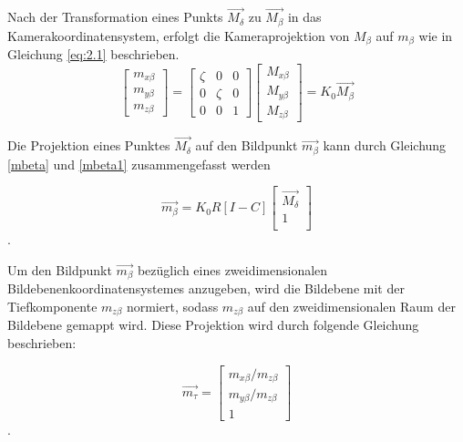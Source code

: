 Nach der Transformation eines Punkts $\vec{M_\delta}$ zu $\vec{M_\beta}$ in das Kamerakoordinatensystem, erfolgt die Kameraprojektion von $M_\beta$ auf $m_\beta$ wie in Gleichung \ref{eq:2.1} beschrieben. %
\begin{equation}
\begin{bmatrix}
m_{x \beta}\\m_{y \beta}\\m_{z \beta}
\end{bmatrix} = \begin{bmatrix}
\zeta&0&0\\
0&\zeta&0\\
0&0&1
\end{bmatrix}
\begin{bmatrix}
M_{x \beta}\\M_{y \beta}\\M_{z \beta}
\end{bmatrix}
=K_0\vec{M_{\beta}}\label{mbeta1}
\end{equation}
\pagebreak

Die Projektion eines Punktes $\vec{M_\delta}$ auf den Bildpunkt $\vec{m_{\beta}}$ kann durch Gleichung \ref{mbeta} und \ref{mbeta1} zusammengefasst werden

\begin{equation}
\vec{m_\beta}
=K_0 R	[I -C] \begin{bmatrix}
\vec{M_\delta}\\
1\\
\end{bmatrix} 
\end{equation}. 


Um den Bildpunkt $\vec{m_{\beta}}$ bezüglich eines zweidimensionalen Bildebenenkoordinatensystemes anzugeben, wird die Bildebene mit der Tiefkomponente $m_{z\beta}$ normiert, sodass $m_{z\beta}$ auf den zweidimensionalen Raum der Bildebene gemappt wird. Diese Projektion wird durch folgende Gleichung beschrieben:

\begin{equation}
\vec{m_\tau} =
\begin{bmatrix}
m_{x \beta}/m_{z \beta}\\m_{y \beta}/m_{z \beta}\\1
\end{bmatrix}
\end{equation}.

